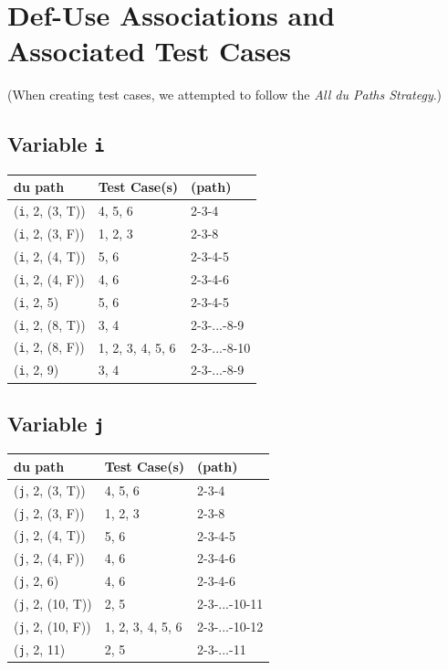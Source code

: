 \documentclass[11pt, oneside]{article}   	%
\begin{document}
\newpage
\section{Def-Use Associations and Associated Test Cases}
(When creating test cases, we attempted to follow the \emph{All du Paths Strategy}.)
\subsection{Variable \texttt{i}}
\begin{table}[H]
	\begin{tabular}{|l|l|l|}
		\hline
		du path                 & Test Case(s)     & (path)       \\ \hline
		(\texttt{i}, 2, (3, T)) & 4, 5, 6          & 2-3-4        \\ \hline
		(\texttt{i}, 2, (3, F)) & 1, 2, 3          & 2-3-8        \\ \hline
		(\texttt{i}, 2, (4, T)) & 5, 6             & 2-3-4-5      \\ \hline
		(\texttt{i}, 2, (4, F)) & 4, 6             & 2-3-4-6      \\ \hline
		(\texttt{i}, 2, 5)      & 5, 6             & 2-3-4-5      \\ \hline
		(\texttt{i}, 2, (8, T)) & 3, 4             & 2-3-...-8-9  \\ \hline
		(\texttt{i}, 2, (8, F)) & 1, 2, 3, 4, 5, 6 & 2-3-...-8-10 \\ \hline
		(\texttt{i}, 2, 9)      & 3, 4             & 2-3-...-8-9  \\ \hline
	\end{tabular}
\end{table}

\subsection{Variable \texttt{j}}
\begin{table}[H]
	\begin{tabular}{|l|l|l|}
		\hline
		du path                  & Test Case(s)     & (path)        \\ \hline
		(\texttt{j}, 2, (3, T))  & 4, 5, 6          & 2-3-4         \\ \hline
		(\texttt{j}, 2, (3, F))  & 1, 2, 3          & 2-3-8         \\ \hline
		(\texttt{j}, 2, (4, T))  & 5, 6             & 2-3-4-5       \\ \hline
		(\texttt{j}, 2, (4, F))  & 4, 6             & 2-3-4-6       \\ \hline
		(\texttt{j}, 2, 6)       & 4, 6             & 2-3-4-6       \\ \hline
		(\texttt{j}, 2, (10, T)) & 2, 5             & 2-3-...-10-11 \\ \hline
		(\texttt{j}, 2, (10, F)) & 1, 2, 3, 4, 5, 6 & 2-3-...-10-12 \\ \hline
		(\texttt{j}, 2, 11)      & 2, 5             & 2-3-...-11    \\ \hline
	\end{tabular}
\end{table}
\end{document}
